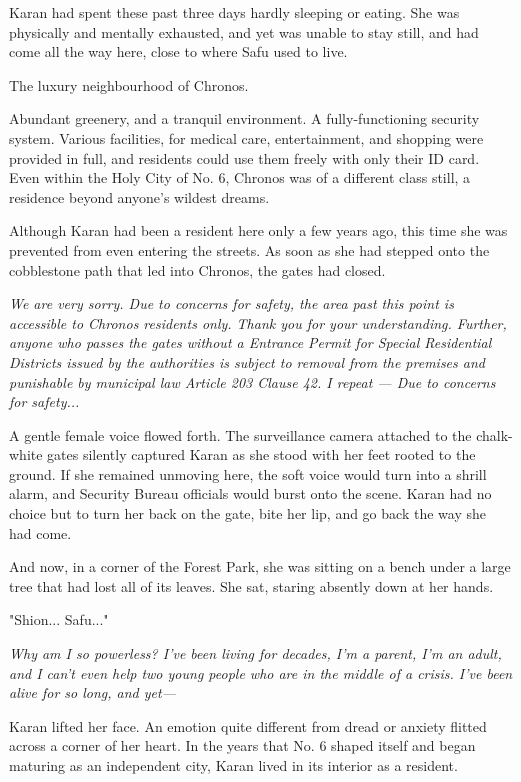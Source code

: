 Karan had spent these past three days hardly sleeping or eating. She was
physically and mentally exhausted, and yet was unable to stay still, and
had come all the way here, close to where Safu used to live.

The luxury neighbourhood of Chronos.

Abundant greenery, and a tranquil environment. A fully-functioning
security system. Various facilities, for medical care, entertainment,
and shopping were provided in full, and residents could use them freely
with only their ID card. Even within the Holy City of No. 6, Chronos was
of a different class still, a residence beyond anyone's wildest dreams.

Although Karan had been a resident here only a few years ago, this time
she was prevented from even entering the streets. As soon as she had
stepped onto the cobblestone path that led into Chronos, the gates had
closed.

\emph{We are very sorry. Due to concerns for safety, the area past this point
is accessible to Chronos residents only. Thank you for your
understanding. Further, anyone who passes the gates without a Entrance
Permit for Special Residential Districts issued by the authorities is
subject to removal from the premises and punishable by municipal law
Article 203 Clause 42. I repeat --- Due to concerns for safety...}

A gentle female voice flowed forth. The surveillance camera attached to
the chalk-white gates silently captured Karan as she stood with her feet
rooted to the ground. If she remained unmoving here, the soft voice
would turn into a shrill alarm, and Security Bureau officials would
burst onto the scene. Karan had no choice but to turn her back on the
gate, bite her lip, and go back the way she had come.

And now, in a corner of the Forest Park, she was sitting on a bench
under a large tree that had lost all of its leaves. She sat, staring
absently down at her hands.

"Shion... Safu..."

\emph{Why am I so powerless? I've been living for decades, I'm a parent, I'm
an adult, and I can't even help two young people who are in the middle
of a crisis. I've been alive for so long, and yet---}

Karan lifted her face. An emotion quite different from dread or anxiety
flitted across a corner of her heart. In the years that No. 6 shaped
itself and began maturing as an independent city, Karan lived in its
interior as a resident.

